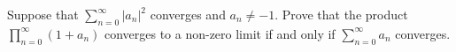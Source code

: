 Suppose that $\sum\limits_{n=0}^{\infty} |a_n|^2$ converges and $a_n \neq -1$. Prove that the product 
$\prod\limits_{n=0}^{\infty} (1 + a_n)$ converges to a non-zero limit if and only if $\sum\limits_{n=0}^{\infty} a_n$ 
converges.

\begin{solution}
  \ \\
\end{solution}